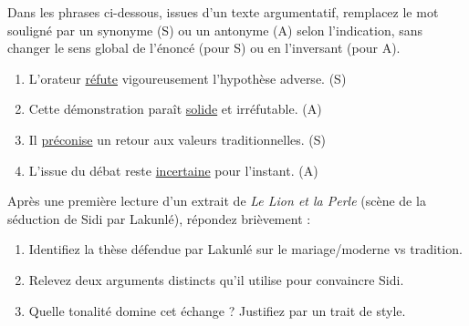 \documentclass[11pt]{article}
\begin{document}
\begin{exercice}
Dans les phrases ci-dessous, issues d'un texte argumentatif, remplacez le mot souligné par un synonyme (S) ou un antonyme (A) selon l'indication, sans changer le sens global de l'énoncé (pour S) ou en l'inversant (pour A).
\begin{enumerate}
    \item L'orateur \underline{réfute} vigoureusement l'hypothèse adverse. (S)
    \item Cette démonstration paraît \underline{solide} et irréfutable. (A)
    \item Il \underline{préconise} un retour aux valeurs traditionnelles. (S)
    \item L'issue du débat reste \underline{incertaine} pour l'instant. (A)
\end{enumerate}
\end{exercice}

\begin{exercice}
Après une première lecture d'un extrait de \textit{Le Lion et la Perle} (scène de la séduction de Sidi par Lakunlé), répondez brièvement :
\begin{enumerate}
    \item Identifiez la thèse défendue par Lakunlé sur le mariage/moderne vs tradition.
    \item Relevez deux arguments distincts qu'il utilise pour convaincre Sidi.
    \item Quelle tonalité domine cet échange ? Justifiez par un trait de style.
\end{enumerate}
\end{exercice}
\end{document}
